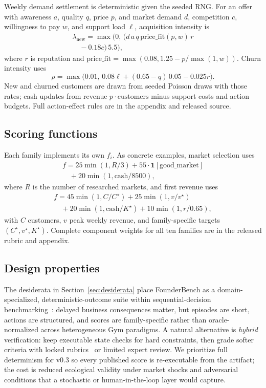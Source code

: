 \documentclass[sigconf,review]{acmart}
\begin{document}
Weekly demand settlement is deterministic given the seeded RNG.
For an offer with awareness $a$, quality $q$, price $p$, and market demand $d$, competition $c$, willingness to pay $w$, and support load $\ell$, acquisition intensity is
\begin{multline}
\lambda_{\mathrm{new}}=\max\!\bigl(0,\,(d\,a\,q\,\mathrm{price\_fit}(p,w)\,r \\
\quad - 0.18c)\,5.5\bigr),
\end{multline}
where $r$ is reputation and $\mathrm{price\_fit}=\max(0.08,1.25-p/\max(1,w))$.
Churn intensity uses
\begin{equation}
\rho=\max\!\bigl(0.01,\,0.08\ell+(0.65-q)\,0.05-0.025r\bigr).
\end{equation}
New and churned customers are drawn from seeded Poisson draws with those rates; cash updates from revenue $p\cdot\mathrm{customers}$ minus support costs and action budgets.
Full action-effect rules are in the appendix and released source.

\subsection{Scoring functions}
Each family implements its own $f_i$.
As concrete examples, market selection uses
\begin{multline}
f=25\min(1,R/3)+55\cdot\mathbf{1}[\mathrm{good\_market}]\\
\quad +20\min(1,\mathrm{cash}/8500),
\end{multline}
where $R$ is the number of researched markets, and first revenue uses
\begin{multline}
f=45\min(1,C/C^\star)+25\min(1,v/v^\star)\\
\quad +20\min(1,\mathrm{cash}/K^\star)+10\min(1,r/0.65),
\end{multline}
with $C$ customers, $v$ peak weekly revenue, and family-specific targets $(C^\star,v^\star,K^\star)$.
Complete component weights for all ten families are in the released rubric and appendix.

\subsection{Design properties}
\label{sec:design-properties}
The desiderata in Section~\ref{sec:desiderata} place FounderBench as a domain-specialized, deterministic-outcome suite within sequential-decision benchmarking~\cite{creus2026agentick}: delayed business consequences matter, but episodes are short, actions are structured, and scores are family-specific rather than oracle-normalized across heterogeneous Gym paradigms.
A natural alternative is \emph{hybrid} verification: keep executable state checks for hard constraints, then grade softer criteria with locked rubrics~\cite{hong2026rulers} or limited expert review.
We prioritize full determinism for v0.3 so every published score is re-executable from the artifact; the cost is reduced ecological validity under market shocks and adversarial conditions that a stochastic or human-in-the-loop layer would capture.
\end{document}
